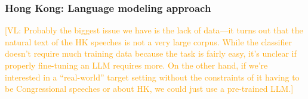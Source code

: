 \documentclass{article}
\newcommand{\vl}[1]{\textcolor{orange}{[VL: #1]}}
\begin{document}

\subsubsection{Hong Kong: Language modeling approach}

\vl{Probably the biggest issue we have is the lack of data---it turns out that the natural text of the HK speeches is not a very large corpus. While the classifier doesn't require much training data because the task is fairly easy, it's unclear if properly fine-tuning an LLM requires more.
\newline
\newline
On the other hand, if we're interested in a ``real-world'' target setting without the constraints of it having to be Congressional speeches or about HK, we could just use a pre-trained LLM.}
\end{document}
